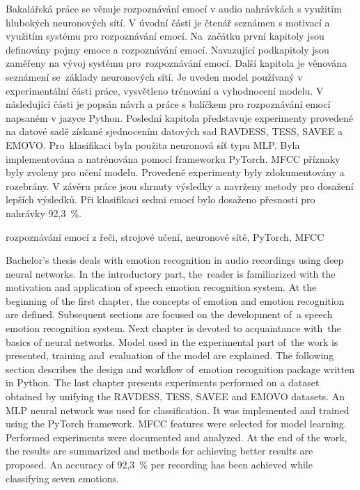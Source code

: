\documentclass[FM,BP]{tulthesis}
\begin{document}

\newpage

\begin{abstractCZ}  %
Bakalářská práce se věnuje rozpoznávání emocí v audio nahrávkách s využitím hlubokých neuronových sítí. V úvodní části je čtenář seznámen s motivací a využitím systému pro rozpoznávání emocí. Na~začátku první kapitoly jsou definovány pojmy emoce a rozpoznávání emocí. Navazující podkapitoly jsou zaměřeny na vývoj systému pro~rozpoznávání emocí. Další kapitola je věnována seznámení se~základy neuronových sítí. Je uveden model používaný v experimentální části práce, vysvětleno trénování a vyhodnocení modelu. V následující části je popsán návrh a práce s balíčkem pro rozpoznávání emocí napsaném v jazyce Python. Poslední kapitola představuje experimenty provedené na datové sadě získané sjednocením datových sad RAVDESS, TESS, SAVEE a EMOVO. Pro~klasifikaci byla použita neuronová síť typu MLP. Byla implementována a natrénována pomocí frameworku PyTorch. MFCC příznaky byly zvoleny pro učení modelu. Provedené experimenty byly zdokumentovány a rozebrány. V závěru práce jsou shrnuty výsledky a navrženy metody pro dosažení lepších výsledků. Při klasifikaci sedmi emocí bylo dosaženo přesnosti pro nahrávky \mbox{92,3 \%}.
\end{abstractCZ}

\begin{keywordsCZ}
rozpoznávání emocí z řeči, strojové učení, neuronové sítě, PyTorch, MFCC
\end{keywordsCZ}

\vspace{2cm}

\begin{abstractEN}
Bachelor's thesis deals with emotion recognition in audio recordings using deep neural networks. In the introductory part, the~reader is familiarized with the motivation and application of speech emotion recognition system. At the beginning of the first chapter, the concepts of emotion and emotion recognition are defined. Subsequent sections are focused on the development of~a speech emotion recognition system. Next chapter is devoted to acquaintance with~the basics of neural networks. Model used in the experimental part of~the work is presented, training and~evaluation of the model are explained. The following section describes the design and workflow of~emotion recognition package written in Python. The last chapter presents experiments performed on a dataset obtained by unifying the RAVDESS, TESS, SAVEE and EMOVO datasets. An MLP neural network was used for classification. It was implemented and trained using the PyTorch framework. MFCC features were selected for model learning. Performed experiments were documented and analyzed. At the end of the work, the results are summarized and methods for achieving better results are proposed. An accuracy of \mbox{92,3 \%} per recording has been achieved while classifying seven emotions.
\end{abstractEN}
\end{document}
